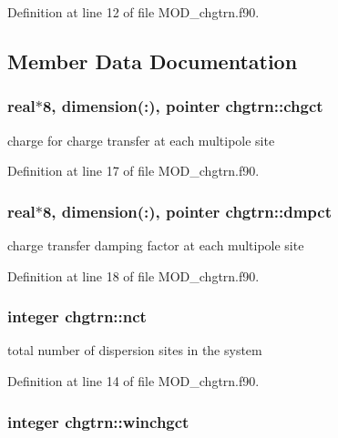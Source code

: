 Definition at line 12 of file M\-O\-D\-\_\-chgtrn.\-f90.



\subsection{Member Data Documentation}
\hypertarget{classchgtrn_adc9ab8ca4f57e7687188e561b1966f6c}{
\subsubsection[{chgct}]{\setlength{\rightskip}{0pt plus 5cm}real$\ast$8, dimension(\-:), pointer chgtrn\-::chgct}}\label{classchgtrn_adc9ab8ca4f57e7687188e561b1966f6c}


charge for charge transfer at each multipole site 



Definition at line 17 of file M\-O\-D\-\_\-chgtrn.\-f90.

\hypertarget{classchgtrn_a3663e0623912a0b6fad975f6796924af}{
\subsubsection[{dmpct}]{\setlength{\rightskip}{0pt plus 5cm}real$\ast$8, dimension(\-:), pointer chgtrn\-::dmpct}}\label{classchgtrn_a3663e0623912a0b6fad975f6796924af}


charge transfer damping factor at each multipole site 



Definition at line 18 of file M\-O\-D\-\_\-chgtrn.\-f90.

\hypertarget{classchgtrn_aa4ef4d48763281fcc2e9da00e35304dd}{
\subsubsection[{nct}]{\setlength{\rightskip}{0pt plus 5cm}integer chgtrn\-::nct}}\label{classchgtrn_aa4ef4d48763281fcc2e9da00e35304dd}


total number of dispersion sites in the system 



Definition at line 14 of file M\-O\-D\-\_\-chgtrn.\-f90.

\hypertarget{classchgtrn_a6249f82de3ead05ff457544f88b30e09}{
\subsubsection[{winchgct}]{\setlength{\rightskip}{0pt plus 5cm}integer chgtrn\-::winchgct}}\label{classchgtrn_a6249f82de3ead05ff457544f88b30e09}


